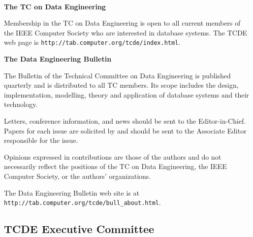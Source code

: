 \documentclass[10pt,twocolumn]{article}
\begin{document}
\verb-  -                     	\newline
\noindent
\begin{small}
{\bf The TC on Data Engineering}

Membership in the TC on Data Engineering
is open to all current members of the IEEE Computer
Society who are interested in database systems.
The TCDE web page is 
\verb+http://tab.computer.org/tcde/index.html+.

\vspace{.1cm}
\noindent 
{\bf The Data Engineering Bulletin}

The Bulletin of the Technical Committee on
Data Engineering is published quarterly and is
distributed to all TC members.  Its
scope includes the design, implementation, 
modelling, theory and application of database 
systems and their technology.  

Letters, conference information, and news
should be sent to the Editor-in-Chief.
Papers for each issue are
solicited by and should be sent to the
Associate Editor responsible for the issue.

Opinions expressed in contributions are those
of the authors and do not necessarily reflect
the positions of the TC on Data Engineering,
the IEEE Computer Society, or the authors'
organizations.

The Data Engineering Bulletin web site is at
\newline
\verb+http://tab.computer.org/tcde/bull_about.html+.
\end{small}

\newpage

\subsection*{TCDE Executive Committee}
\end{document}
